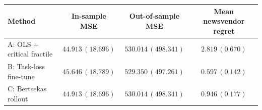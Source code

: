 \begin{tabular}{lccc}
\hline\hline
Method & In-sample MSE & Out-of-sample MSE & Mean newsvendor regret \\
\hline
A: OLS + critical fractile & $44.913\,(18.696)$ & $530.014\,(498.341)$ & $2.819\,(0.670)$ \\
B: Task-loss fine-tune & $45.646\,(18.789)$ & $529.350\,(497.261)$ & $0.597\,(0.142)$ \\
C: Bertsekas rollout & $44.913\,(18.696)$ & $530.014\,(498.341)$ & $0.946\,(0.177)$ \\
\hline\hline
\end{tabular}
